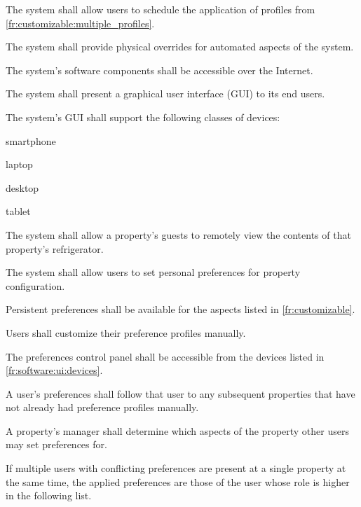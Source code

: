 \documentclass[letter,titlepage,oneside,english]{report}
\begin{document}
\begin{fr}
\begin{fr}
    The system shall allow users to schedule the application of profiles from \ref{fr:customizable:multiple_profiles}.
  \item
    The system shall provide physical overrides for automated aspects of the system.
  \end{fr}
\item\label{fr:software}
  The system's software components shall be accessible over the Internet.
  \begin{fr}
  \item\label{fr:software:ui}
    The system shall present a graphical user interface (GUI) to its end users.
    \begin{fr}
    \item\label{fr:software:ui:devices}
      The system's GUI shall support the following classes of devices:
      \begin{fr}
      \item
        smartphone
      \item
        laptop
      \item
        desktop
      \item
        tablet
      \end{fr}
    \end{fr}
  \item\label{fr:software:fridge}
    The system shall allow a property's guests to remotely view the contents of that property's refrigerator.
  \end{fr}
\item
  The system shall allow users to set personal preferences for property configuration.
  \begin{fr}
  \item
    Persistent preferences shall be available for the aspects listed in \ref{fr:customizable}.
  \item
    Users shall customize their preference profiles manually.
  \item
    The preferences control panel shall be accessible from the devices listed in \ref{fr:software:ui:devices}.
  \item
    A user's preferences shall follow that user to any subsequent properties that have not already had preference profiles manually.
  \item
    A property's manager shall determine which aspects of the property other users may set preferences for.
  \item\label{fr:preferences:order}
    If multiple users with conflicting preferences are present at a single property at the same time, the applied preferences are those of the user whose role is higher in the following list.

\end{fr}
\end{fr}
\end{document}

